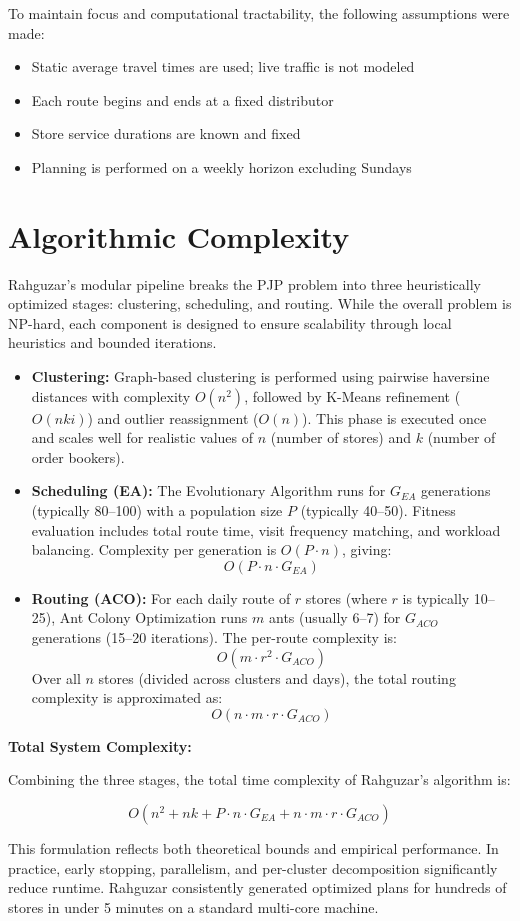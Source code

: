 To maintain focus and computational tractability, the following assumptions were made:

\begin{itemize}
  \item Static average travel times are used; live traffic is not modeled
  \item Each route begins and ends at a fixed distributor
  \item Store service durations are known and fixed
  \item Planning is performed on a weekly horizon excluding Sundays
\end{itemize}

\section{Algorithmic Complexity}

Rahguzar’s modular pipeline breaks the PJP problem into three heuristically optimized stages: clustering, scheduling, and routing. While the overall problem is NP-hard, each component is designed to ensure scalability through local heuristics and bounded iterations.

\begin{itemize}
  \item \textbf{Clustering:} Graph-based clustering is performed using pairwise haversine distances with complexity $O(n^2)$, followed by K-Means refinement ($O(nki)$) and outlier reassignment ($O(n)$). This phase is executed once and scales well for realistic values of $n$ (number of stores) and $k$ (number of order bookers).

  \item \textbf{Scheduling (EA):} The Evolutionary Algorithm runs for $G_{EA}$ generations (typically 80–100) with a population size $P$ (typically 40–50). Fitness evaluation includes total route time, visit frequency matching, and workload balancing. Complexity per generation is $O(P \cdot n)$, giving:
  \[
  O(P \cdot n \cdot G_{EA})
  \]

  \item \textbf{Routing (ACO):} For each daily route of $r$ stores (where $r$ is typically 10–25), Ant Colony Optimization runs $m$ ants (usually 6–7) for $G_{ACO}$ generations (15–20 iterations). The per-route complexity is:
  \[
  O(m \cdot r^2 \cdot G_{ACO})
  \]
  Over all $n$ stores (divided across clusters and days), the total routing complexity is approximated as:
  \[
  O(n \cdot m \cdot r \cdot G_{ACO})
  \]
\end{itemize}

\textbf{Total System Complexity:}

Combining the three stages, the total time complexity of Rahguzar’s algorithm is:

\[
O(n^2 + nk + P \cdot n \cdot G_{EA} + n \cdot m \cdot r \cdot G_{ACO})
\]

This formulation reflects both theoretical bounds and empirical performance. In practice, early stopping, parallelism, and per-cluster decomposition significantly reduce runtime. Rahguzar consistently generated optimized plans for hundreds of stores in under 5 minutes on a standard multi-core machine.
